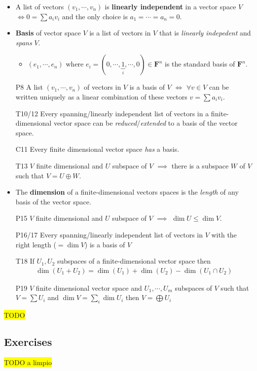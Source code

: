\documentclass[11pt,notitlepage,oneside]{article}
\newcommand{\hilight}[1]{\colorbox{yellow}{#1}}
\DeclareMathOperator{\dimension}{dim}
\begin{document}
\begin{itemize}
\item A list of vectors $(v_1,\cdots,v_n)$ is \textbf{linearly independent} in a vector space $V$ $\iff 0 = \sum a_i v_i$
and the only choice is $a_1=\cdots=a_n=0$.
%
\item \textbf{Basis} of vector space $V$ is a list of vectors in $V$ that is \emph{linearly indepedent} and \emph{spans} $V$.
\begin{itemize}
\item $(e_1, \cdots, e_n)$ where $e_i=(0,\cdots, \underbrace{1}_{i},\cdots,0)\in\mathbf{F}^n$ is the standard basis of $\mathbf{F}^n$. 
\end{itemize}
\item[P8] A list $(v_1,\cdots,v_n)$ of vectors in $V$ is a basis of $V$ $\iff$ $\forall v\in V$ can be written uniquely as a linear combination of these vectors $v=\sum a_i v_i$.
\item[T10/12] Every spanning/linearly independent  list of vectors in a finite-dimensional vector space can be \emph{reduced}/\emph{extended} to a basis of the vector space.
\item[C11] Every finite dimensional vector space \emph{has} a basis.
\item[T13] $V$ finite dimensional and $U$ subspace of $V$ $\implies$ there is a subspace $W$ of $V$ such that $V=U\oplus W$.
%
\item The \textbf{dimension} of a finite-dimensional vectors spaces is the \emph{length} of any basis of the vector space.
\item[P15] $V$ finite dimensional and $U$ subspace of $V$ $\implies$ $\dimension{U}\leq\dimension{V}$.
%
\item[P16/17]Every spanning/linearly independent list of vectors in $V$ with the right length ($=\dimension{V}$) is a basis of $V$ 
%
\item[T18] If $U_1,U_2$ subspaces of a finite-dimensional vector space then 
\begin{align*}
\dimension(U_1+U_2)=\dimension(U_1)+\dimension(U_2) - \dimension(U_1\cap U_2)
\end{align*}
\item[P19] $V$ finite dimensional vector space and $U_1,\cdots,U_m$ subspaces of $V$ such that $V=\sum U_i$ and $\dimension{V}=\sum_i\dimension{U_i}$ then $V=\bigoplus U_i$
\end{itemize}
\hilight{TODO}
\subsection*{Exercises}
\hilight{TODO a limpio}
\end{document}
